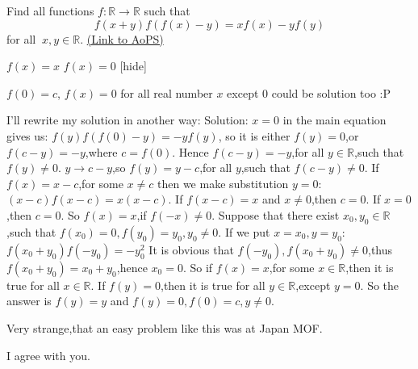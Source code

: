 \begin{problem}
	Find all functions $ f : \mathbb{R} \to \mathbb{R}$ such that \[ f(x+y)f(f(x)-y)=xf(x)-yf(y)\] for all $ \ x,y \in \mathbb{R}.$
	\flushright \href{https://artofproblemsolving.com/community/c6h188108}{(Link to AoPS)}
\end{problem}



\begin{solution}
$ f(x)=x$
$ f(x)=0$
[\/hide]
\end{solution}



\begin{solution}
	$ f(0) = c$, $ f(x) = 0$ for all real number $ x$ except 0 could be solution too :P
\end{solution}



\begin{solution}
	I'll rewrite my solution in another way:
Solution:
$ x = 0$ in the main equation gives us:
$ f(y)f(f(0) - y) = - yf(y)$,
so it is either $ f(y) = 0$,or $ f(c - y) = - y$,where $ c = f(0)$.
Hence $ f(c - y) = - y$,for all $ y\in\mathbb{R}$,such that $ f(y)\neq 0$.
$ y\rightarrow c - y$,so $ f(y) = y - c$,for all $ y$,such that $ f(c - y)\neq 0$.
If $ f(x) = x - c$,for some $ x\neq c$ then we make substitution
$ y = 0$:
$ (x - c)f(x - c) = x(x - c)$.
If $ f(x - c) = x$ and $ x\neq 0$,then $ c = 0$.
If $ x = 0$,then $ c = 0$.
So $ f(x) = x$,if $ f( - x)\neq 0$.
Suppose that there exist $ x_0,y_0\in\mathbb{R}$,such that $ f(x_0) = 0,f(y_0) = y_0,y_0\neq 0$.
If we put $ x = x_0,y = y_0$:
$ f(x_0 + y_0)f( - y_0) = - y_0^2$
It is obvious that $ f( - y_0),f(x_0 + y_0)\neq 0$,thus $ f(x_0 + y_0) = x_0 + y_0$,hence $ x_0 = 0$.
So if $ f(x) = x$,for some $ x\in\mathbb{R}$,then it is true for all $ x\in\mathbb{R}$.
If $ f(y) = 0$,then it is true for all $ y\in\mathbb{R}$,except $ y = 0$.
So the answer is $ f(y) = y$ and $ f(y) = 0,f(0) = c,y\neq 0$.
\end{solution}



\begin{solution}
	\begin{tcolorbox}Very strange,that an easy problem like this was at Japan MOF.\end{tcolorbox}

I agree with you.
\end{solution}



